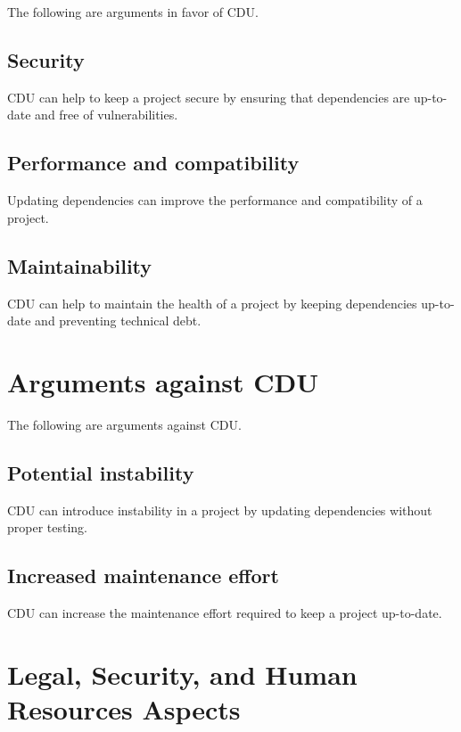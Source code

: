 \documentclass{article}
\begin{document}
The following are arguments in favor of CDU.

\subsection{Security}
\label{subsec:security}

CDU can help to keep a project secure by ensuring that dependencies are up-to-date and free of vulnerabilities.

\subsection{Performance and compatibility}
\label{subsec:performance-and-compatibility}

Updating dependencies can improve the performance and compatibility of a project.

\subsection{Maintainability}
\label{subsec:maintainability}

CDU can help to maintain the health of a project by keeping dependencies up-to-date and preventing technical debt.

\section{Arguments against CDU}
\label{sec:arguments-against-cdu}

The following are arguments against CDU.

\subsection{Potential instability}
\label{subsec:potential-instability}

CDU can introduce instability in a project by updating dependencies without proper testing.

\subsection{Increased maintenance effort}
\label{subsec:increased-maintenance-effort}

CDU can increase the maintenance effort required to keep a project up-to-date.

\section{Legal, Security, and Human Resources Aspects}
\label{sec:legal-security-and-human-resources-aspects}
\end{document}
